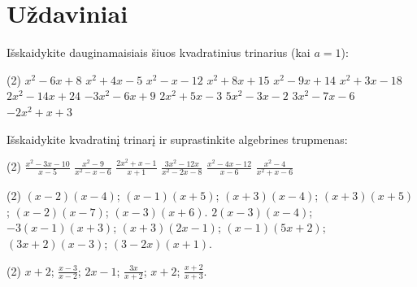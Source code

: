 \documentclass[11pt,a4paper]{scrartcl}
\begin{document}
\section{Uždaviniai}

\begin{problem}
Išskaidykite dauginamaisiais šiuos kvadratinius trinarius (kai $a=1$):
\begin{tasks}[label={(\arabic*)}, label-offset=0.9em](2)
    \task $x^2 - 6x + 8$
    \task $x^2 + 4x - 5$
    \task $x^2 - x - 12$
    \task $x^2 + 8x + 15$
    \task $x^2 - 9x + 14$
    \task $x^2 + 3x - 18$
    \task $2x^2 - 14x + 24$
    \task $-3x^2 - 6x + 9$
    \task $2x^2 + 5x - 3$
    \task $5x^2 - 3x - 2$
    \task $3x^2 - 7x - 6$
    \task $-2x^2 + x + 3$
\end{tasks}
\end{problem}

\begin{problem}
Išskaidykite kvadratinį trinarį ir suprastinkite algebrines trupmenas:
\begin{tasks}[label={(\arabic*)}, label-offset=0.9em](2)
    \task $\frac{x^2 - 3x - 10}{x - 5}$
    \task $\frac{x^2 - 9}{x^2 - x - 6}$
    \task $\frac{2x^2 + x - 1}{x + 1}$
    \task $\frac{3x^2 - 12x}{x^2 - 2x - 8}$
    \task $\frac{x^2 - 4x - 12}{x - 6}$
    \task $\frac{x^2 - 4}{x^2 + x - 6}$
\end{tasks}
\end{problem}

\newpage
\answerssection

\begin{problem} \phantom{text}
\begin{tasks}[label={(\arabic*)}, label-offset=0.9em](2)
    \task $(x-2)(x-4)$;
    \task $(x-1)(x+5)$;
    \task $(x+3)(x-4)$;
    \task $(x+3)(x+5)$;
    \task $(x-2)(x-7)$;
    \task $(x-3)(x+6)$.
    \task $2(x-3)(x-4)$;
    \task $-3(x-1)(x+3)$;
    \task $(x+3)(2x-1)$;
    \task $(x-1)(5x+2)$;
    \task $(3x+2)(x-3)$;
    \task $(3-2x)(x+1)$.
\end{tasks}
\end{problem}

\begin{problem} \phantom{text}
\begin{tasks}[label={(\arabic*)}, label-offset=0.9em](2)
    \task $x+2$;
    \task $\frac{x-3}{x-2}$;
    \task $2x-1$;
    \task $\frac{3x}{x+2}$;
    \task $x+2$;
    \task $\frac{x+2}{x+3}$.
\end{tasks}
\end{problem}
\end{document}
